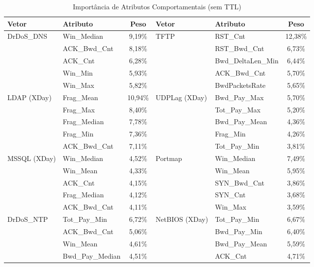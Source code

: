 \documentclass[12pt,a4paper]{article}
\begin{document}
\begin{center}
\footnotesize
\begin{longtable}{p{2.8cm} l c | p{2.8cm} l c}
\caption{Import\^{a}ncia de Atributos Comportamentais (sem TTL)} \\
\toprule
Vetor & Atributo & Peso & Vetor & Atributo & Peso \\
\midrule
DrDoS\_DNS    & Win\_Median & 9,19\% & TFTP        & RST\_Cnt & 12,38\% \\
             & ACK\_Bwd\_Cnt & 8,18\% &             & RST\_Bwd\_Cnt & 6,73\% \\
             & ACK\_Cnt & 6,28\% &             & Bwd\_DeltaLen\_Min & 6,44\% \\
             & Win\_Min & 5,93\% &             & ACK\_Bwd\_Cnt & 5,70\% \\
             & Win\_Max & 5,82\% &             & BwdPacketsRate & 5,65\% \\
\midrule
LDAP (XDay)  & Frag\_Mean & 10,94\% & UDPLag (XDay) & Bwd\_Pay\_Max & 5,70\% \\
             & Frag\_Max & 8,40\% &               & Tot\_Pay\_Max & 5,20\% \\
             & Frag\_Median & 7,78\% &               & Bwd\_Pay\_Mean & 4,36\% \\
             & Frag\_Min & 7,36\% &               & Frag\_Min & 4,26\% \\
             & ACK\_Bwd\_Cnt & 7,11\% &               & Tot\_Pay\_Min & 3,81\% \\
\midrule
MSSQL (XDay) & Win\_Median & 4,52\% & Portmap     & Win\_Median & 7,49\% \\
             & Win\_Mean & 4,33\% &             & Win\_Mean & 5,95\% \\
             & ACK\_Cnt & 4,15\% &             & SYN\_Bwd\_Cnt & 3,86\% \\
             & Frag\_Median & 4,12\% &             & SYN\_Cnt & 3,68\% \\
             & ACK\_Bwd\_Cnt & 4,11\% &             & Win\_Max & 3,59\% \\
\midrule
DrDoS\_NTP    & Tot\_Pay\_Min & 6,72\% & NetBIOS (XDay) & Tot\_Pay\_Min & 6,67\% \\
             & ACK\_Bwd\_Cnt & 5,06\% &                & Bwd\_Pay\_Min & 6,40\% \\
             & Win\_Mean & 4,61\% &                & Bwd\_Pay\_Mean & 5,59\% \\
             & Bwd\_Pay\_Median & 4,51\% &                & ACK\_Cnt & 4,71\% \\

\end{longtable}
\end{center}
\end{document}
